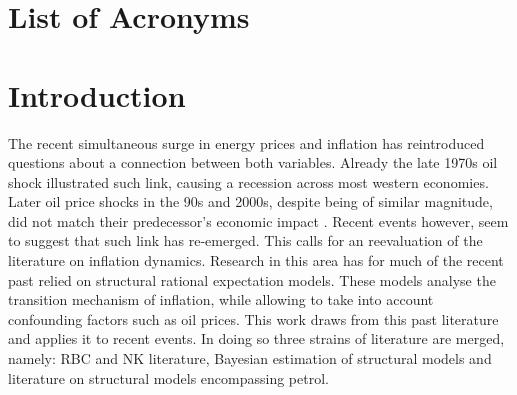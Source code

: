 \documentclass[12pt,a4paper,english]{article} %
\let\oldsection\section
\renewcommand\section{\clearpage\oldsection}
\begin{document}
	
	\section*{List of Acronyms}
	\begin{acronym}
	\end{acronym}
	\listoffigures
	\listoftables
	\pagebreak
	
		
	\tableofcontents
	\pagebreak
	
	
	 \section{Introduction}
	 The recent simultaneous surge in energy prices and inflation has reintroduced questions about a connection between both variables. Already the late 1970s oil shock illustrated such link, causing a recession across most western economies. Later oil price shocks in the 90s and 2000s, despite being of similar magnitude, did not match their predecessor's economic impact \cite{blanchard_macroeconomic_2007}. Recent events however, seem to suggest that such link has re-emerged. This calls for an reevaluation of the literature on inflation dynamics.
	 Research in this area has for much of the recent past relied on structural rational expectation models. These models analyse the transition mechanism of inflation, while allowing to take into account confounding factors such as oil prices. This work draws from this past literature and applies it to recent events. In doing so three strains of literature are merged, namely: \ac{RBC} and \ac{NK} literature, Bayesian estimation of structural models and literature on structural models encompassing petrol. 
	 
\end{document}
